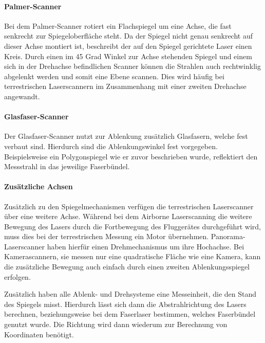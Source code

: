\documentclass[a4paper,12pt,bibliography=totoc, listof=totoc,titlepage,pointlessnumbers]{scrreprt}
\begin{document}
\paragraph{Palmer-Scanner}
Bei dem Palmer-Scanner rotiert ein Flachspiegel um eine Achse, die fast senkrecht zur Spiegeloberfläche steht. Da der Spiegel nicht genau senkrecht auf dieser Achse montiert ist, beschreibt der auf den Spiegel gerichtete Laser einen Kreis. Durch einen im 45 Grad Winkel zur Achse stehenden Spiegel und einem sich in der Drehachse befindlichen Scanner können die Strahlen auch rechtwinklig abgelenkt werden und somit eine Ebene scannen. Dies wird häufig bei terrestrischen Laser\-scan\-nern im Zusammenhang mit einer zweiten Drehachse angewandt.

\paragraph{Glasfaser-Scanner}
\label{p:faserscanner}
Der Glasfaser-Scanner nutzt zur Ablenkung zusätzlich Glasfasern, welche fest verbaut sind. Hierdurch sind die Ablenkungswinkel fest vorgegeben. Beispielsweise ein Polygonspiegel wie er zuvor beschrieben wurde, reflektiert den Messstrahl in das jeweilige Faserbündel. 

\paragraph{Zusätzliche Achsen}
Zusätzlich zu den Spiegelmechanismen verfügen die terrestrischen Laser\-scan\-ner über eine weitere Achse. Während bei dem Air\-borne Laser\-scan\-ning die weitere Bewegung des Lasers durch die Fortbewegung des Fluggerätes durchgeführt wird, muss dies bei der terrestrischen Messung ein Motor übernehmen. Panorama-Laser\-scan\-ner haben hierfür einen Drehmechanismus um ihre Hochachse. Bei Kamera\-scannern, sie messen nur eine quadratische Fläche wie eine Kamera, kann die zusätzliche Bewegung auch einfach durch einen zweiten Ablenkungsspiegel erfolgen. \citep[S. 37]{beraldin}

Zusätzlich haben alle Ablenk- und Drehsysteme eine Messeinheit, die den Stand des Spiegels misst. Hierdurch lässt sich dann die Abstrahlrichtung des Lasers berechnen, beziehungsweise bei dem Faserlaser bestimmen, welches Faserbündel genutzt wurde. Die Richtung wird dann wiederum zur Berechnung von Koordinaten benötigt.
\end{document}
